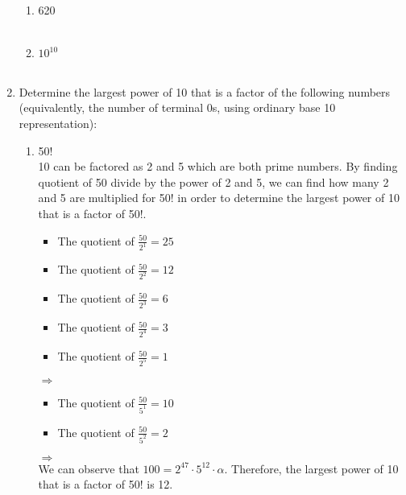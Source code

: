 \documentclass[12pt]{article}
\begin{document}
\begin{enumerate}
\begin{enumerate}[label=(\alph*)]
        \item 620 \\
        \\
        
        \item $10^{10}$ \\
        \\
    \end{enumerate}

    
    \newpage
    \item Determine the largest power of 10 that is a factor of the following numbers (equivalently, the number of terminal 0s, using ordinary base 10 representation):
    \begin{enumerate}[label=(\alph*)]
        \item 50!\\
        
        10 can be factored as 2 and 5 which are both prime numbers. By finding quotient of 50 divide by the power of 2 and 5, we can find how many 2 and 5 are multiplied for 50! in order to determine the largest power of 10 that is a factor of 50!.
        \begin{itemize}
            \item The quotient of $\frac{50}{2^1} = 25$
            \item The quotient of $\frac{50}{2^2} = 12$
            \item The quotient of $\frac{50}{2^3} = 6$
            \item The quotient of $\frac{50}{2^4} = 3$
            \item The quotient of $\frac{50}{2^5} = 1$
        \end{itemize}
        $\Rightarrow$ 
        
        \begin{itemize}
            \item The quotient of $\frac{50}{5^1} = 10$
            \item The quotient of $\frac{50}{5^2} = 2$
        \end{itemize}
         $\Rightarrow$ \\
         
         We can observe that $100=2^{47}\cdot 5^{12}\cdot \alpha$. Therefore, the largest power of 10 that is a factor of 50! is 12.\\
         

\end{enumerate}
\end{enumerate}
\end{document}
